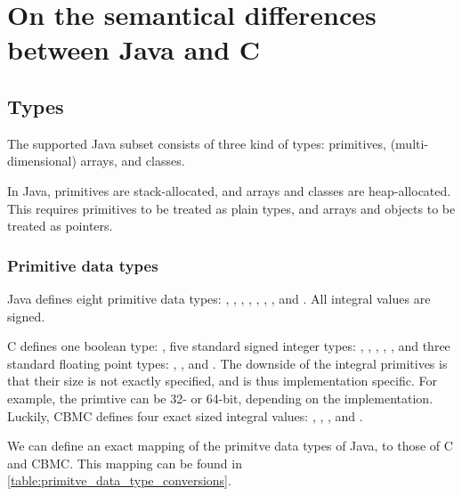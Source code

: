 \chapter{On the semantical differences between Java and C}

\section{Types}
The supported Java subset consists of three kind of types: primitives, 
(multi-dimensional) arrays, and classes.

In Java, primitives are stack-allocated, and arrays and classes are heap-allocated.
This requires primitives to be treated as plain types, and arrays and objects to
be treated as pointers.

\subsection{Primitive data types}
Java defines eight primitive data types: , 
, , , ,
, , and . All integral 
values are signed.

C defines one boolean type: , five standard signed integer types: 
, , , ,
, and three standard floating point types: ,
, and  \cite[p.~40]{iso_c_standard}. The 
downside of the integral primitives is that their size is not exactly specified, 
and is thus implementation specific. For example, the  primtive can
be 32- or 64-bit, depending on the implementation. Luckily, CBMC defines four
exact sized integral values: , , 
, and  \cite[p.~39]{cprover_manual}.

We can define an exact mapping of the primitve data types of Java, to those of
C and CBMC. This mapping can be found in \ref{table:primitve_data_type_conversions}.

